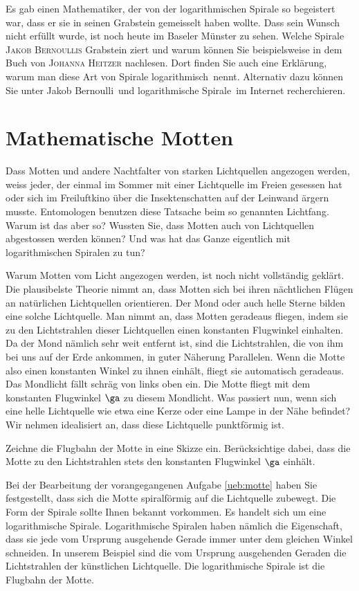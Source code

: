 \documentclass[%
11pt,%
twoside,%
titlepage,%
german,%
headsepline%
]{scrartcl}
\begin{document}
\begin{bem}
Es gab einen Mathematiker, der von der logarithmischen Spirale so begeistert war, dass er sie in seinen Grabstein gemeisselt haben wollte. Dass sein Wunsch nicht erf\"ullt wurde, ist noch heute im Baseler M\"unster zu sehen. Welche Spirale \textsc{Jakob Bernoullis} Grabstein ziert und warum k\"onnen Sie beispielsweise in dem Buch von \textsc{Johanna Heitzer} nachlesen. Dort finden Sie auch eine Erkl\"arung, warum man diese Art von Spirale \glqq logarithmisch\grqq\ nennt. Alternativ dazu k\"onnen Sie unter \glqq Jakob Bernoulli\grqq\ und \glqq logarithmische Spirale\grqq\ im Internet recherchieren.
\end{bem}

\section{Mathematische Motten}

Dass Motten und andere Nachtfalter von starken Lichtquellen angezogen werden, weiss jeder, der einmal im Sommer mit einer Lichtquelle im Freien gesessen hat oder sich im Freiluftkino \"uber die Insektenschatten auf der Leinwand ärgern musste. Entomologen benutzen diese Tatsache beim so genannten Lichtfang.
Warum ist das aber so? Wussten Sie, dass Motten auch von Lichtquellen abgestossen werden k\"onnen? Und was hat das Ganze eigentlich mit logarithmischen Spiralen zu tun?

Warum Motten vom Licht angezogen werden, ist noch nicht vollständig geklärt. Die plausibelste Theorie nimmt an, dass Motten sich bei ihren nächtlichen Fl\"ugen an nat\"urlichen Lichtquellen orientieren. Der Mond oder auch helle Sterne bilden eine solche Lichtquelle.
Man nimmt an, dass Motten geradeaus fliegen, indem sie zu den Lichtstrahlen dieser Lichtquellen einen konstanten Flugwinkel einhalten. Da der Mond nämlich sehr weit entfernt ist, sind die Lichtstrahlen, die von ihm bei uns auf der Erde ankommen, in guter Näherung Parallelen. Wenn die Motte also einen konstanten Winkel zu ihnen einhält, fliegt sie automatisch geradeaus.
Das Mondlicht fällt schräg von links oben ein. Die Motte fliegt mit dem konstanten Flugwinkel $\ga$ zu diesem Mondlicht.
Was passiert nun, wenn sich eine helle Lichtquelle wie etwa eine Kerze oder eine Lampe in der Nähe befindet?
Wir nehmen idealisiert an, dass diese Lichtquelle punktf\"ormig ist.
\begin{ueb}[Motte]\label{ueb:motte}
Zeichne die Flugbahn der Motte in eine Skizze ein. Ber\"ucksichtige dabei, dass die Motte zu den Lichtstrahlen stets den konstanten Flugwinkel $\ga$ einhält.
\end{ueb}
Bei der Bearbeitung der vorangegangenen Aufgabe \ref{ueb:motte} haben Sie festgestellt, dass sich die Motte spiralf\"ormig auf die Lichtquelle zubewegt.
Die Form der Spirale sollte Ihnen bekannt vorkommen. Es handelt sich um eine logarithmische Spirale.
Logarithmische Spiralen haben nämlich die Eigenschaft, dass sie jede vom Ursprung ausgehende Gerade immer unter dem gleichen Winkel schneiden. In unserem Beispiel sind die vom Ursprung ausgehenden Geraden die Lichtstrahlen der k\"unstlichen Lichtquelle. Die logarithmische Spirale ist die Flugbahn der Motte.
\end{document}
